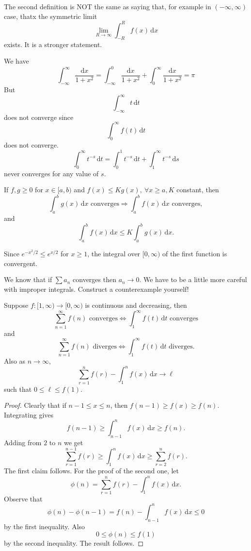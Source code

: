 \begin{remark}
    The second definition is NOT the same as saying that, for example in $(-\infty,\infty) $ case, thatx the symmetric limit
    \[
        \lim_{R \to \infty} \int_{-R}^{R} f(x) \,\mathrm{d}x
    \]
    exists. It is a stronger statement.
\end{remark}
\begin{example}
    We have
    $$\int_{-\infty}^\infty\frac{\mathrm dx}{1+x^2}=\int_{-\infty}^0\frac{\mathrm dx}{1+x^2}+\int_{0}^\infty\frac{\mathrm dx}{1+x^2}=\pi$$
    But
    $$\int_{-\infty}^\infty t\,\mathrm dt$$
    does not converge since
    $$\int_0^\infty f(t)\,\mathrm dt$$
    does not converge.
    $$\int_0^\infty t^{-s}\,\mathrm dt=\int_0^1 t^{-s}\,\mathrm dt+\int_1^\infty t^{-s}\,\mathrm ds$$
    never converges for any value of $s$.
\end{example}
\begin{sprop}
    If $f,g\ge 0$ for $x\in [a,b)$ and $ f(x)\le Kg(x),\ \forall x\ge a, K $ constant, then 
    \[
        \int_{a}^{b} g(x) \,\mathrm{d}x \text{ converges} \Longrightarrow \int_{a}^{b} f(x) \,\mathrm{d}x \text{ converges},
    \]
    and 
    \[
        \int_{a}^{b} f(x) \,\mathrm{d}x\le K \int_{a}^{b} g(x) \,\mathrm{d}x.
    \]
\end{sprop}
\begin{example}
    Since $ e^{-x^2/2}\le e^{x/2} $ for $x\ge 1$, the integral over $ [0,\infty) $ of the first function is convergent.
\end{example}
\begin{remark}
    We know that if $ \sum a_n $ converges then $ a_n\to 0 $. We have to be a little more careful with improper integrals. Construct a counterexample yourself!
\end{remark}

\begin{theorem}
    Suppose $f:[1,\infty)\to[0,\infty)$ is continuous and decreasing, then
    $$\sum_{n=1}^\infty f(n) \text{ converges} \Longleftrightarrow \int_1^\infty f(t)\,\mathrm dt \text{ converges}$$
    and 
    \[
        \sum_{n=1}^\infty f(n) \text{ diverges} \Longleftrightarrow \int_1^\infty f(t)\,\mathrm dt \text{ diverges}.
    \]
    Also as $ n\to \infty $, 
    \[
        \sum_{r=1}^{n}f(r)-\int_{1}^{n} f(x) \,\mathrm{d}x\to \ell 
    \]
    such that $ 0\le \ell \le f(1) $.
\end{theorem}
\begin{proof}
    Clearly that if $ n-1\le x\le n $, then $ f(n-1)\ge f(x)\ge f(n) $. Integrating gives 
    \[
        f(n-1)\ge \int_{n-1}^{n} f(x) \,\mathrm{d}x\ge f(n).
    \]
    Adding from $2$ to $n$ we get 
    \[
        \sum_{r=1}^{n-1}f(r) \ge \int_{1}^{n} f(x) \,\mathrm{d}x\ge \sum_{r=2}^{n}f(r).
    \]
    The first claim follows. For the proof of the second one, let
    \[
        \phi(n) = \sum_{r=1}^{n}f(r)-\int_{1}^{n} f(x) \,\mathrm{d}x.
    \]
    Observe that 
    \[
        \phi(n)-\phi(n-1) = f(n)-\int_{n-1}^{n} f(x) \,\mathrm{d}x\le 0
    \]
    by the first inequality. Also 
    \[
        0\le \phi(n)\le f(1)
    \]
    by the second inequality. The result follows.
\end{proof}